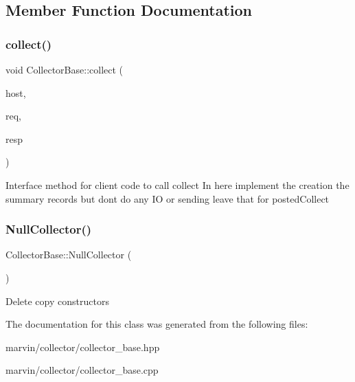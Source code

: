 \subsection{Member Function Documentation}
\mbox{\label{class_collector_base_a0754879d950cf3eedfaad04e9572e36c}} 
\subsubsection{\texorpdfstring{collect()}{collect()}}
{\footnotesize\ttfamily void Collector\+Base\+::collect (\begin{DoxyParamCaption}\item[{std\+::string \&}]{host,  }\item[{Message\+Reader\+S\+Ptr}]{req,  }\item[{Message\+Writer\+S\+Ptr}]{resp }\end{DoxyParamCaption})}

Interface method for client code to call collect In here implement the creation the summary records but dont do any IO or sending leave that for posted\+Collect\mbox{\label{class_collector_base_afcc95192e8c0de4e422f615d61b28b98}} 
\subsubsection{\texorpdfstring{Null\+Collector()}{NullCollector()}}
{\footnotesize\ttfamily Collector\+Base\+::\+Null\+Collector (\begin{DoxyParamCaption}\item[{Null\+Collector const \&}]{ }\end{DoxyParamCaption})\hspace{0.3cm}{\ttfamily [delete]}}

Delete copy constructors 

The documentation for this class was generated from the following files\+:\begin{DoxyCompactItemize}
\item 
marvin/collector/collector\+\_\+base.\+hpp\item 
marvin/collector/collector\+\_\+base.\+cpp\end{DoxyCompactItemize}

